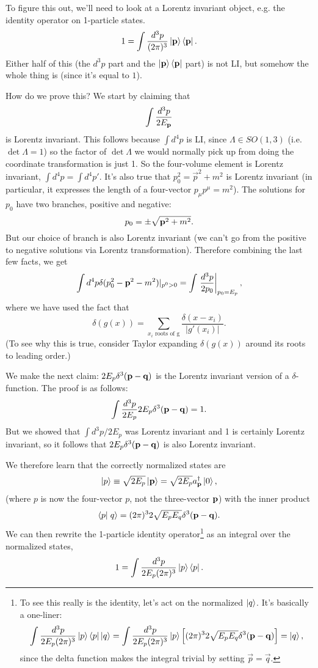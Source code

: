 To figure this out, we'll need to look at a Lorentz invariant object, e.g. the identity operator on 1-particle states.
$$1=\int \frac{d^3p}{(2\pi)^3} \left| \boldsymbol{\mathbf{p}} \right>\left< \boldsymbol{\mathbf{p}} \right|.$$
Either half of this (the $d^3p$ part and the $\left| \boldsymbol{\mathbf{p}} \right>\left< \boldsymbol{\mathbf{p}} \right|$ part) is not LI, but somehow the whole thing is (since it's equal to $1$).

How do we prove this? We start by claiming that
$$\int \frac{d^3p}{2E_{\boldsymbol{\mathbf{p}}}}$$ is Lorentz invariant. This follows because $\int d^4p$ is LI, since $\Lambda \in SO(1,3)$ (i.e. $\det \Lambda=1$) so the factor of $\det \Lambda$ we would normally pick up from doing the coordinate transformation is just 1. So the four-volume element is Lorentz invariant, $\int d^4p = \int d^4 p'$. It's also true that $p_0^2= \vec{p}^2+m^2$ is Lorentz invariant (in particular, it expresses the length of a four-vector $p_\mu p^\mu = m^2$). The solutions for $p_0$ have two branches, positive and negative:
$$p_0 = \pm \sqrt{\boldsymbol{\mathbf{p}}^2+m^2}.$$
But our choice of branch is also Lorentz invariant (we can't go from the positive to negative solutions via Lorentz transformation). Therefore combining the last few facts, we get
$$\int d^4 p \delta(p_0^2-\boldsymbol{\mathbf{p}}^2-m^2)|_{p^0 >0} = \int \left.\frac{d^3 p}{2p_0}\right|_{p_0=E_p},$$
where we have used the fact that $$\delta(g(x))=\sum_{x_i\text{ roots of g}} \frac{\delta(x-x_i)}{|g'(x_i)|}.$$
(To see why this is true, consider Taylor expanding $\delta(g(x))$ around its roots to leading order.)

We make the next claim: $2E_p \delta^3(\boldsymbol{\mathbf{p}} - \boldsymbol{\mathbf{q}})$ is the Lorentz invariant version of a $\delta$-function. The proof is as follows:
$$\int \frac{d^3 p}{2E_p} 2E_p \delta^3(\boldsymbol{\mathbf{p}} - \boldsymbol{\mathbf{q}})=1.$$
But we showed that $\int d^3p/2E_p$ was Lorentz invariant and 1 is certainly Lorentz invariant, so it follows that $2E_p\delta^3(\boldsymbol{\mathbf{p}}-\boldsymbol{\mathbf{q}})$ is also Lorentz invariant.

We therefore learn that the correctly normalized states are
$$\left| p \right>\equiv \sqrt{2E_p}\left| \boldsymbol{\mathbf{p}} \right> = \sqrt{2 E_p}a_{\boldsymbol{\mathbf{p}}}^\dagger \left| 0 \right>,$$
(where $p$ is now the four-vector $p$, not the three-vector $\boldsymbol{\mathbf{p}}$) with the inner product
$$\braket{p}{q}=(2\pi)^3 2\sqrt{E_p E_q} \delta^3(\pv - \vec q).$$
We can then rewrite the 1-particle identity operator\footnote{To see this really is the identity, let's act on the normalized $\left| q \right>$. It's basically a one-liner:
$$\int \frac{d^3p}{2E_p(2\pi)^3}\left| p \right>\left< p \right|\left| q \right>=\int\frac{d^3p}{2E_p(2\pi)^3}\left| p \right>\left[(2\pi)^3 2\sqrt{E_pE_q}\delta^3(\boldsymbol{\mathbf{p}}-\boldsymbol{\mathbf{q}})\right]=\left| q \right>,$$ since the delta function makes the integral trivial by setting $\vec p = \vec q$.} as an integral over the normalized states,
$$1=\int \frac{d^3p}{2E_p(2\pi)^3} \left| p \right>\left< p \right|.$$


